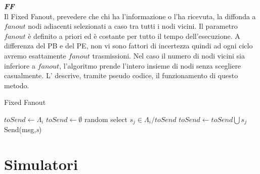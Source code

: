 \noindent\textbf{\textit{\acf{FF}}}\\
Il Fixed Fanout, prevedere che chi ha l'informazione o l'ha ricevuta, la diffonda a $\mathit{fanout}$ nodi adiacenti selezionati a caso tra tutti i nodi vicini. Il parametro $\mathit{fanout}$ è definito a priori ed è costante per tutto il tempo dell'esecuzione. A differenza del \acs{PB} e del \acs{PE}, non vi sono fattori di incertezza quindi ad ogni ciclo avremo esattamente $\mathit{fanout}$ trasmissioni. Nel caso il numero di nodi vicini sia inferiore a $\mathit{fanout}$, l'algoritmo prende l'intero insieme di nodi senza scegliere casualmente. L' descrive, tramite pseudo codice, il funzionamento di questo metodo.
\bigskip
\begin{algorithm}[h]
	\caption{Fixed Fanout}\label{alg:gossipFF}
	\begin{algorithmic}[1]
				\State $ \textit{toSend} \gets \Lambda_i $
			\Else
				\State $ \textit{toSend} \gets \emptyset $
					\State random select $ \textit{s}_\textit{j} \in \Lambda_{i}/\textit{toSend} $
					\State $ \textit{toSend} \gets \textit{toSend}\bigcup \textit{s}_\textit{j}$
				\EndFor
			\EndIf
				\State Send(msg,\emph{s})
			\EndFor
		\EndFunction
	\end{algorithmic}
\end{algorithm}
\bigskip



\section{Simulatori}
\label{sec:simulatori}

